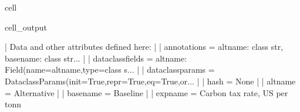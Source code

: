 \documentclass[letterpaper,10pt,english]{jupyterBook}
\begin{document}
\begin{sphinxuseclass}{cell}
\begin{sphinxVerbatimOutput}
\begin{sphinxuseclass}{cell_output}
\begin{sphinxVerbatim}[commandchars=\\\{\}]
     |  Data and other attributes defined here:
     |  
     |  \PYGZus{}\PYGZus{}annotations\PYGZus{}\PYGZus{} = \PYGZob{}\PYGZsq{}altname\PYGZsq{}: \PYGZlt{}class \PYGZsq{}str\PYGZsq{}\PYGZgt{}, \PYGZsq{}basename\PYGZsq{}: \PYGZlt{}class \PYGZsq{}str\PYGZsq{}\PYGZgt{}...
     |  
     |  \PYGZus{}\PYGZus{}dataclass\PYGZus{}fields\PYGZus{}\PYGZus{} = \PYGZob{}\PYGZsq{}altname\PYGZsq{}: Field(name=\PYGZsq{}altname\PYGZsq{},type=\PYGZlt{}class \PYGZsq{}s...
     |  
     |  \PYGZus{}\PYGZus{}dataclass\PYGZus{}params\PYGZus{}\PYGZus{} = \PYGZus{}DataclassParams(init=True,repr=True,eq=True,or...
     |  
     |  \PYGZus{}\PYGZus{}hash\PYGZus{}\PYGZus{} = None
     |  
     |  altname = \PYGZsq{}Alternative\PYGZsq{}
     |  
     |  basename = \PYGZsq{}Baseline\PYGZsq{}
     |  
     |  expname = \PYGZsq{}Carbon tax rate, US\PYGZdl{} per tonn \PYGZsq{}
    

\end{sphinxVerbatim}
\end{sphinxuseclass}
\end{sphinxVerbatimOutput}
\end{sphinxuseclass}
\end{document}
